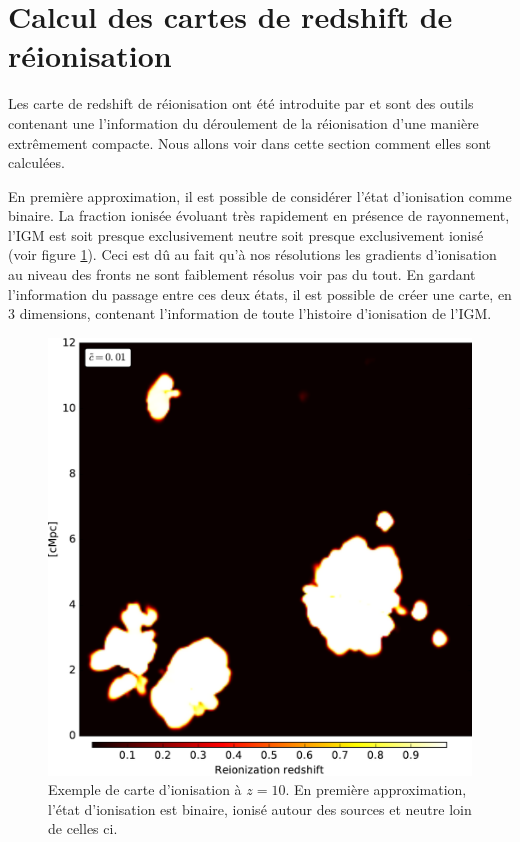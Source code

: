 

\section{Calcul des cartes de redshift de réionisation}
\label{sec:zmapcompute}

Les carte de redshift de réionisation ont été introduite par \cite{2008ApJ...689L..81T} et sont des outils contenant une l'information du déroulement de la réionisation d'une manière extrêmement compacte.
Nous allons voir dans cette section comment elles sont calculées.

En première approximation, il est possible de considérer l'état d'ionisation comme binaire.
La fraction ionisée évoluant très rapidement en présence de rayonnement, l'\ac{IGM} est soit presque exclusivement neutre soit presque exclusivement ionisé (voir figure \ref{fig:xionmap}).
Ceci est dû au fait qu'à nos résolutions les gradients d'ionisation au niveau des fronts ne sont faiblement résolus voir pas du tout.
En gardant l'information du passage entre ces deux états, il est possible de créer une carte, en 3 dimensions, contenant l’information de toute l'histoire d'ionisation de l'\ac{IGM}.


\begin{figure}
        \includegraphics[width=.95\linewidth]{img/04_mapreio/xion_map.pdf} 
        \caption[Carte d'ionisation]{Exemple de carte d'ionisation à $z=10$.
        En première approximation, l'état d'ionisation est binaire, ionisé autour des sources et neutre loin de celles ci.
 		\label{fig:xionmap}}
\end{figure}


